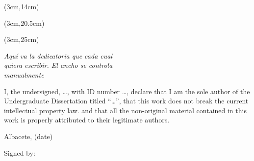 \begin{textblock*}{\textwidth}(3cm,14cm) 
\begin{center}\doublespacing 
{\fontsize{22pt}{4pt}\selectfont \bft{\titulo}}
\end{center}
\end{textblock*}


\begin{textblock*}{\textwidth}(3cm,20.5cm) 
\begin{flushleft}\doublespacing
{\fontsize{14pt}{4pt}\selectfont {} \autor}

{\fontsize{14pt}{4pt}\selectfont {} \director}

{\fontsize{14pt}{4pt}\selectfont {} \codirector}
\end{flushleft}
\end{textblock*}


\begin{textblock*}{\linewidth}(3cm,25cm) 
\begin{flushright}
{\fontsize{14pt}{4pt}\selectfont \fecha}
\end{flushright}
\end{textblock*}


\cleardoublepage
\thispagestyle{empty}

\vspace*{9cm}  
\begin{flushright} \em 
Aquí va la dedicatoria que cada cual \\ 
quiera escribir. El ancho se controla \\ 
manualmente
\end{flushright}


\cleardoublepage
\thispagestyle{plain}
\begin{center}
\Large{}
\end{center}
\vskip1cm

I, the undersigned, \quad \ldots \quad, with ID number \quad \ldots \quad, declare that I am the sole author of the Undergraduate Dissertation titled ``\quad \ldots \quad '', that this work does not break the current intellectual property law. and that all the non-original material contained in this work is properly attributed to their legitimate authors.

\vspace*{2cm}
\begin{center}
Albacete, (date) 

\vskip3cm

Signed by: \autor
\end{center}



